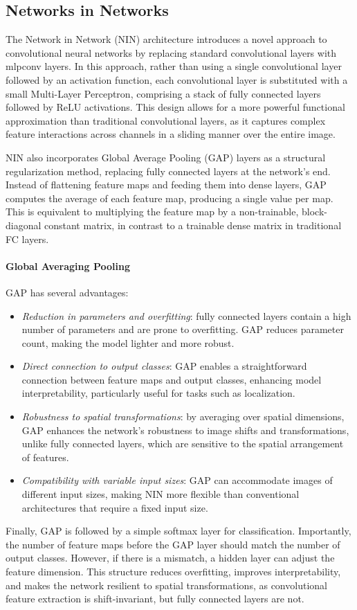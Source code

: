 \subsection{Networks in Networks}
The Network in Network (NIN) architecture introduces a novel approach to convolutional neural networks by replacing standard convolutional layers with mlpconv layers. 
In this approach, rather than using a single convolutional layer followed by an activation function, each convolutional layer is substituted with a small Multi-Layer Perceptron, comprising a stack of fully connected layers followed by ReLU activations. 
This design allows for a more powerful functional approximation than traditional convolutional layers, as it captures complex feature interactions across channels in a sliding manner over the entire image.

NIN also incorporates Global Average Pooling (GAP) layers as a structural regularization method, replacing fully connected layers at the network's end. 
Instead of flattening feature maps and feeding them into dense layers, GAP computes the average of each feature map, producing a single value per map. 
This is equivalent to multiplying the feature map by a non-trainable, block-diagonal constant matrix, in contrast to a trainable dense matrix in traditional FC layers.

\paragraph*{Global Averaging Pooling}
GAP has several advantages:
\begin{itemize}
    \item \textit{Reduction in parameters and overfitting}: fully connected layers contain a high number of parameters and are prone to overfitting.
        GAP reduces parameter count, making the model lighter and more robust.
    \item \textit{Direct connection to output classes}: GAP enables a straightforward connection between feature maps and output classes, enhancing model interpretability, particularly useful for tasks such as localization.
    \item \textit{Robustness to spatial transformations}: by averaging over spatial dimensions, GAP enhances the network's robustness to image shifts and transformations, unlike fully connected layers, which are sensitive to the spatial arrangement of features.
    \item \textit{Compatibility with variable input sizes}: GAP can accommodate images of different input sizes, making NIN more flexible than conventional architectures that require a fixed input size.
\end{itemize}
Finally, GAP is followed by a simple softmax layer for classification. 
Importantly, the number of feature maps before the GAP layer should match the number of output classes. 
However, if there is a mismatch, a hidden layer can adjust the feature dimension.
This structure reduces overfitting, improves interpretability, and makes the network resilient to spatial transformations, as convolutional feature extraction is shift-invariant, but fully connected layers are not.

